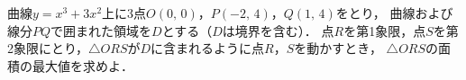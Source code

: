 \documentclass[../../main.tex]{subfiles}
\begin{document}
曲線$y=x^3+3x^2$上に3点$O(0, \, 0)$，$P(-2, \, 4)$，$Q(1, \, 4)$をとり，
曲線および線分$PQ$で囲まれた領域を$D$とする（$D$は境界を含む）．
点$R$を第1象限，点$S$を第2象限にとり，$\triangle ORS$が$D$に含まれるように点$R$，$S$を動かすとき，
$\triangle ORS$の面積の最大値を求めよ．
\end{document}
